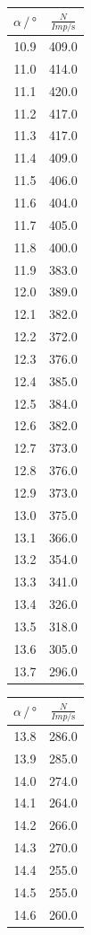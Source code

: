 \begin{table}
  \begin{tabular}[t]{cc}
  \toprule
  $\alpha \,/\, \si{\degree} $ & $\frac{N}{Imp/\si{\second}}$ \\
  \midrule
  10.9 & 409.0\\
  11.0 & 414.0\\
  11.1 & 420.0\\
  11.2 & 417.0\\
  11.3 & 417.0\\
  11.4 & 409.0\\
  11.5 & 406.0\\
  11.6 & 404.0\\
  11.7 & 405.0\\
  11.8 & 400.0\\
  11.9 & 383.0\\
  12.0 & 389.0\\
  12.1 & 382.0\\
  12.2 & 372.0\\
  12.3 & 376.0\\
  12.4 & 385.0\\
  12.5 & 384.0\\
  12.6 & 382.0\\
  12.7 & 373.0\\
  12.8 & 376.0\\
  12.9 & 373.0\\
  13.0 & 375.0\\
  13.1 & 366.0\\
  13.2 & 354.0\\
  13.3 & 341.0\\
  13.4 & 326.0\\
  13.5 & 318.0\\
  13.6 & 305.0\\
  13.7 & 296.0  \\
  \bottomrule
  \end{tabular}
  \begin{tabular}[t]{cc}
  \toprule
  $\alpha \,/\, \si{\degree} $ & $\frac{N}{Imp/\si{\second}}$ \\
  \midrule
  13.8 & 286.0  \\
  13.9 & 285.0  \\
  14.0 & 274.0  \\
  14.1 & 264.0  \\
  14.2 & 266.0  \\
  14.3 & 270.0  \\
  14.4 & 255.0  \\
  14.5 & 255.0  \\
  14.6 & 260.0  \\

\end{tabular}
\end{table}
